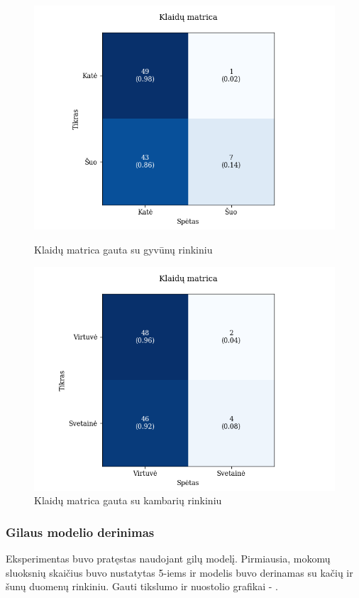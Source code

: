 \documentclass{VUMIFPSbakalaurinis}
\begin{document}
\begin{figure}[!htbp]
    \centering
    \begin{minipage}[b]{0.49\textwidth}
      \includegraphics[width=\textwidth]{img/small/5/KM_smal_DC_5.png}
      \caption{Klaidų matrica gauta su gyvūnų rinkiniu}
    \end{minipage}
    \begin{minipage}[b]{0.49\textwidth}
      \includegraphics[width=\textwidth]{img/small/5/KM_smal_Room_5.png}
      \caption{Klaidų matrica gauta su kambarių rinkiniu}
    \end{minipage}
\end{figure}



\subsubsection{Gilaus modelio derinimas}
Eksperimentas buvo pratęstas naudojant gilų modelį.
Pirmiausia, mokomų sluoksnių skaičius buvo nustatytas 5-iems ir modelis buvo derinamas su kačių ir šunų duomenų rinkiniu. Gauti tikslumo ir nuostolio grafikai - .
\end{document}
